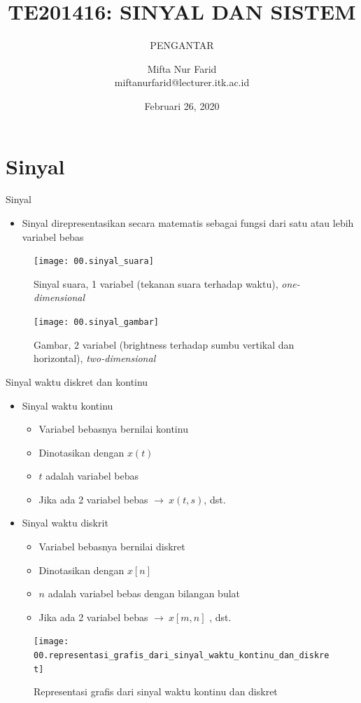 \documentclass[aspectratio=169]{beamer}
\author{Mifta Nur Farid \\
	miftanurfarid@lecturer.itk.ac.id}
\title{TE201416: SINYAL DAN SISTEM}
\subtitle{PENGANTAR}
\institute{Teknik Elektro \\ Institut Teknologi Kalimantan \\ Balikpapan, Indonesia}
\date{\tiny Februari 26, 2020}
\begin{document}
\begin{frame}[t,plain]
\titlepage
\end{frame}

\section{Sinyal}

\begin{frame}{Sinyal}
	\begin{itemize}
		\item Sinyal direpresentasikan secara matematis sebagai fungsi dari satu atau lebih variabel bebas
	\end{itemize}
	\begin{multicols}{2}
		\begin{figure}
			\texttt{[image: 00.sinyal\_suara]}
			\caption{Sinyal suara, 1 variabel (tekanan suara terhadap waktu), \textit{one-dimensional}}
		\end{figure}
		\begin{figure}
			\texttt{[image: 00.sinyal\_gambar]}
			\caption{Gambar, 2 variabel (brightness terhadap sumbu vertikal dan horizontal), \textit{two-dimensional}}
		\end{figure}
	\end{multicols}
\end{frame}

\begin{frame}{Sinyal waktu diskret dan kontinu}
	\begin{multicols}{2}
		\begin{itemize}
			\item Sinyal waktu kontinu
			\begin{itemize}
				\item Variabel bebasnya bernilai kontinu
				\item Dinotasikan dengan $ x(t) $
				\item $ t $ adalah variabel bebas
				\item Jika ada 2 variabel bebas $ \rightarrow ~ x(t,s) $, dst.
			\end{itemize}
			\item Sinyal waktu diskrit
			\begin{itemize}
				\item Variabel bebasnya bernilai diskret
				\item Dinotasikan dengan $ x[n] $
				\item $ n $ adalah variabel bebas dengan bilangan bulat
				\item Jika ada 2 variabel bebas $ \rightarrow ~ x[m,n] $ , dst.
			\end{itemize}
		\end{itemize}
		\vfill\null
		\columnbreak
		\begin{figure}
			\centering
			\texttt{[image: 00.representasi\_grafis\_dari\_sinyal\_waktu\_kontinu\_dan\_diskret]}
			\caption{Representasi grafis dari sinyal waktu kontinu dan diskret}
		\end{figure}
	\end{multicols}
\end{frame}
\end{document}
